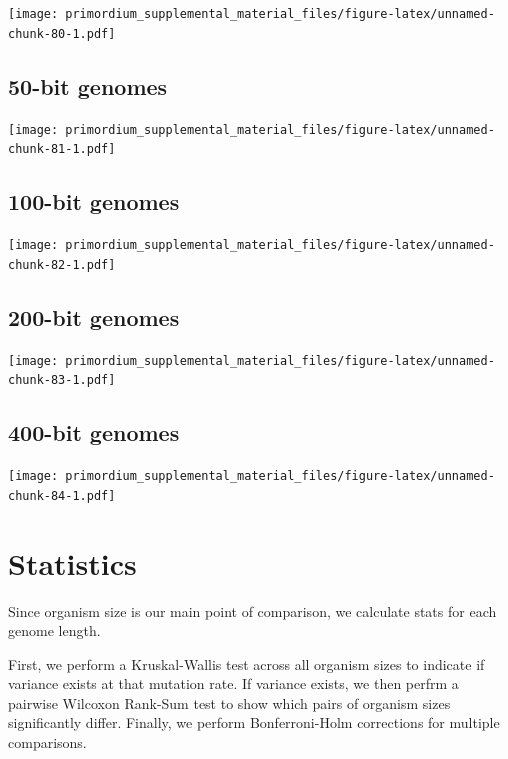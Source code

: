 \documentclass[]{book}
\begin{document}
\texttt{[image: primordium\_supplemental\_material\_files/figure-latex/unnamed-chunk-80-1.pdf]}

\hypertarget{bit-genomes-1}{%
\subsection{50-bit genomes}\label{bit-genomes-1}}

\texttt{[image: primordium\_supplemental\_material\_files/figure-latex/unnamed-chunk-81-1.pdf]}

\hypertarget{bit-genomes-2}{%
\subsection{100-bit genomes}\label{bit-genomes-2}}

\texttt{[image: primordium\_supplemental\_material\_files/figure-latex/unnamed-chunk-82-1.pdf]}

\hypertarget{bit-genomes-3}{%
\subsection{200-bit genomes}\label{bit-genomes-3}}

\texttt{[image: primordium\_supplemental\_material\_files/figure-latex/unnamed-chunk-83-1.pdf]}

\hypertarget{bit-genomes-4}{%
\subsection{400-bit genomes}\label{bit-genomes-4}}

\texttt{[image: primordium\_supplemental\_material\_files/figure-latex/unnamed-chunk-84-1.pdf]}

\hypertarget{statistics-4}{%
\section{Statistics}\label{statistics-4}}

Since organism size is our main point of comparison, we calculate stats for each genome length.

First, we perform a Kruskal-Wallis test across all organism sizes to indicate if variance exists at that mutation rate.
If variance exists, we then perfrm a pairwise Wilcoxon Rank-Sum test to show which pairs of organism sizes significantly differ.
Finally, we perform Bonferroni-Holm corrections for multiple comparisons.
\end{document}
